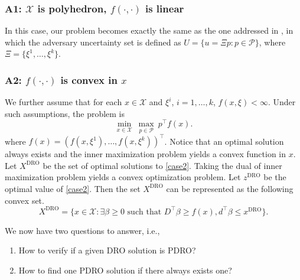\documentclass[10pt]{article}
\theoremstyle{plain}
\theoremstyle{definition}
\theoremstyle{remark}
\newcommand{\mcal}{\mathcal}
\newcommand{\tr}{^{\top}}
\begin{document}
\subsubsection*{A1: $\mcal{X}$ is polyhedron, $f(\cdot,\cdot)$ is linear}
In this case, our problem becomes exactly the same as the one addressed in
\citet{iancu2013pareto}, in which the adversary uncertainty set is defined as
$U = \{u=\Xi p: p\in \mcal{P}\}$, where $\Xi = \{\xi^1,\dots, \xi^k\}$.

\subsubsection*{A2: $f(\cdot,\cdot)$ is convex in $x$}
We further assume that for each $x\in \mcal{X}$ and $\xi^i$, $i=1,\dots, k$,
$f(x,\xi)<\infty$. Under such assumptions, the problem is
\begin{equation}\label{case2}
\min_{x\in \mcal{X}}~\max_{p\in \mcal{P}}~p\tr f(x).
\end{equation}
where $f(x) = (f(x,\xi^1),\dots, f(x,\xi^k))\tr$.
Notice that an optimal solution always exists and the inner maximization problem yields a convex function in $x$.
Let $X^{\text{DRO}}$ be the set of optimal solutions to \eqref{case2}.
Taking the dual of inner maximization problem yields a convex optimization problem.
Let $z^{\text{DRO}}$ be the optimal value of \eqref{case2}. Then the set $X^{\text{DRO}}$ can be represented as the following convex set.
\[X^{\text{DRO}} = \{x\in \mcal{X}: \exists \beta\ge 0 \text{ such that } D\tr\beta\ge f(x), d\tr\beta \le x^{\text{DRO}}\}.\]

We now have two questions to answer, i.e.,
\begin{enumerate}[topsep=0pt,noitemsep,label=(\arabic*)]
	\item How to verify if a given DRO solution is PDRO?
	\item How to find one PDRO solution if there always exists one?
\end{enumerate}
\end{document}
